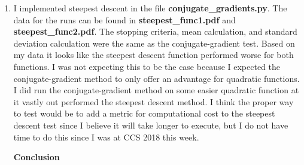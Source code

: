 \documentclass[11pt]{article}
\begin{document}
\begin{enumerate}
{\bf Function 2}

$$ g(x) = x_0x_1 + (1-x_0)^2 + (2-x_1)^2+ (3-x_2)^2+ (4-x_3)^2+ (5-x_4)^2+ ... $$
$$ (6-x_5)^2+ (7-x_6)^2+ (8-x_7)^2+ (9-x_8)^2+ (10-x_9)^2 $$

Function 2 actual global minimum input vector: [0, 2, 3, 4, 5, 6, 7, 8, 9, 10]

Function 2 evaluated at global minimum: 1

The data from the runs can be found in the tables in files  {\bf function2\_epsilon\_variation.pdf} and \\
{\bf function2\_gc\_freq\_variations.pdf}. My data for the restart frequency variations indicates that low frequency values (meaning the steepest descent step is taken more often) make the algorithm perform better for this function. I'm not really sure why this is and I think it will take more time than I have to figure it out. This is shown by the lower percent error for lower restart frequency values. The epsilon data also makes more sense for this function because as the epsilon value was increased the percent error and iterations both increased, as expected. With higher epsilon values the algorithm should run for a shorter amount of time and should be less accurate as it will stop earlier.

\item I implemented steepest descent in the file {\bf conjugate\_gradients.py}. The data for the runs can be found in {\bf steepest\_func1.pdf} and {\bf steepest\_func2.pdf}. The stopping criteria, mean calculation, and standard deviation calculation were the same as the conjugate-gradient test. Based on my data it looks like the steepest descent function performed worse for both functions. I was not expecting this to be the case because I expected the conjugate-gradient method to only offer an advantage for quadratic functions. I did run the conjugate-gradient method on some easier quadratic function at it vastly out performed the steepest descent method. I think the proper way to test would be to add a metric for computational cost to the steepest descent test since I believe it will take longer to execute, but I do not have time to do this since I was at CCS 2018 this week.

{\bf Conclusion}


\end{enumerate}
\end{document}
